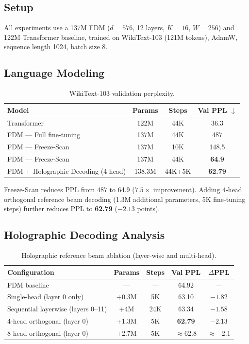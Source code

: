 \documentclass{article}
\begin{document}
\subsection{Setup}
All experiments use a 137M FDM ($d{=}576$, 12 layers, $K{=}16$, $W{=}256$)
and 122M Transformer baseline, trained on WikiText-103 \citep{merity2017pointer}
(121M tokens), AdamW, sequence length 1024, batch size 8.

\subsection{Language Modeling}

\begin{table}[h]
\centering
\caption{WikiText-103 validation perplexity.}
\label{tab:lm}
\begin{tabular}{lccc}
\toprule
Model & Params & Steps & Val PPL $\downarrow$ \\
\midrule
Transformer & 122M & 44K & 36.3 \\
FDM --- Full fine-tuning & 137M & 44K & 487 \\
FDM --- Freeze-Scan & 137M & 10K & 148.5 \\
FDM --- Freeze-Scan & 137M & 44K & \textbf{64.9} \\
FDM + Holographic Decoding (4-head) & 138.3M & 44K+5K & \textbf{62.79} \\
\bottomrule
\end{tabular}
\end{table}

Freeze-Scan reduces PPL from 487 to 64.9 ($7.5\times$ improvement).
Adding 4-head orthogonal reference beam decoding
(1.3M additional parameters, 5K fine-tuning steps)
further reduces PPL to \textbf{62.79} ($-2.13$ points).

\subsection{Holographic Decoding Analysis}

\begin{table}[h]
\centering
\caption{Holographic reference beam ablation (layer-wise and multi-head).}
\label{tab:holo}
\begin{tabular}{lcccc}
\toprule
Configuration & Params & Steps & Val PPL & $\Delta$PPL \\
\midrule
FDM baseline & --- & --- & 64.92 & --- \\
Single-head (layer 0 only) & +0.3M & 5K & 63.10 & $-1.82$ \\
Sequential layerwise (layers 0--11) & +4M & 24K & 63.34 & $-1.58$ \\
4-head orthogonal (layer 0) & +1.3M & 5K & \textbf{62.79} & $\mathbf{-2.13}$ \\
8-head orthogonal (layer 0) & +2.7M & 5K & $\approx$62.8 & $\approx$$-2.1$ \\
\bottomrule
\end{tabular}
\end{table}
\end{document}
